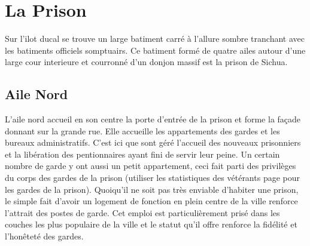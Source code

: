 \section{La Prison}

Sur l'ilot ducal se trouve un large batiment carré à l'allure sombre
tranchant avec les batiments officiels somptuairs. Ce batiment formé
de quatre ailes autour d'une large cour interieure et courronné d'un donjon
massif est la prison de Sichua.

\subsection{Aile Nord}

L'aile nord accueil en son centre la porte d'entrée de la prison et forme la 
façade donnant sur la grande rue. Elle accueille les appartements des gardes 
et les bureaux administratifs. C'est ici que sont géré l'accueil des nouveaux 
prisonniers et la libération des pentionnaires ayant fini de servir leur 
peine. Un certain nombre de garde y ont aussi un petit appartement, ceci fait 
parti des privilèges du corps des gardes de la prison (utiliser les 
statistiques des vétérants page \pageref{Veteran} pour les gardes de la 
prison). Quoiqu'il ne soit pas très enviable d'habiter une prison, le simple 
fait d'avoir un logement de fonction en plein centre de la ville renforce 
l'attrait des postes de garde. Cet emploi est particulièrement prisé dans 
les couches les plus populaire de la ville et le statut qu'il offre renforce 
la fidélité et l'honêteté des gardes.

